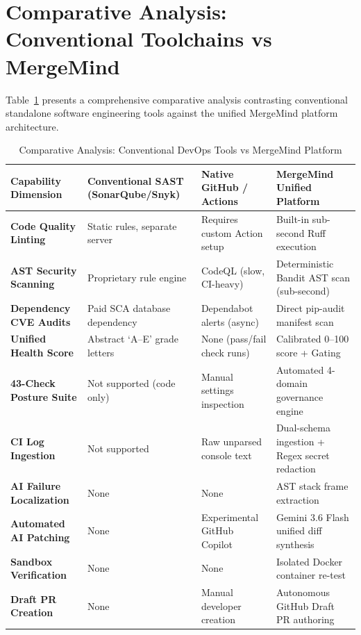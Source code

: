 \documentclass[12pt,a4paper,oneside]{report}
\begin{document}
\section{Comparative Analysis: Conventional Toolchains vs MergeMind}
\label{sec:lit-comparison}

Table~\ref{tab:comparative-analysis} presents a comprehensive comparative analysis contrasting conventional standalone software engineering tools against the unified MergeMind platform architecture.

\begin{table}[htbp]
    \centering
    \caption{Comparative Analysis: Conventional DevOps Tools vs MergeMind Platform}
    \label{tab:comparative-analysis}
    \small
    \begin{tabularx}{\textwidth}{p{} p{} p{} p{}}
        \toprule
        \textbf{Capability Dimension} & \textbf{Conventional SAST (SonarQube/Snyk)} & \textbf{Native GitHub / Actions} & \textbf{MergeMind Unified Platform} \\
        \midrule
        \textbf{Code Quality Linting} & Static rules, separate server & Requires custom Action setup & Built-in sub-second Ruff execution \\
        \addlinespace
        \textbf{AST Security Scanning} & Proprietary rule engine & CodeQL (slow, CI-heavy) & Deterministic Bandit AST scan (sub-second) \\
        \addlinespace
        \textbf{Dependency CVE Audits} & Paid SCA database dependency & Dependabot alerts (async) & Direct pip-audit manifest scan \\
        \addlinespace
        \textbf{Unified Health Score} & Abstract `A--E' grade letters & None (pass/fail check runs) & Calibrated 0--100 score + Gating \\
        \addlinespace
        \textbf{43-Check Posture Suite} & Not supported (code only) & Manual settings inspection & Automated 4-domain governance engine \\
        \addlinespace
        \textbf{CI Log Ingestion} & Not supported & Raw unparsed console text & Dual-schema ingestion + Regex secret redaction \\
        \addlinespace
        \textbf{AI Failure Localization} & None & None & AST stack frame extraction \\
        \addlinespace
        \textbf{Automated AI Patching} & None & Experimental GitHub Copilot & Gemini 3.6 Flash unified diff synthesis \\
        \addlinespace
        \textbf{Sandbox Verification} & None & None & Isolated Docker container re-test \\
        \addlinespace
        \textbf{Draft PR Creation} & None & Manual developer creation & Autonomous GitHub Draft PR authoring \\
        \bottomrule
    \end{tabularx}
\end{table}
\end{document}

